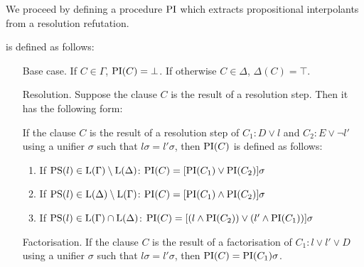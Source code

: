We proceed by defining a procedure $\operatorname{PI}$ which extracts propositional interpolants from a resolution refutation.

\begin{defi}
	 is defined as follows:
\begin{itemize}
	\item[Base case.]
		If $C \in \Gamma$, $\operatorname{PI}(C) = \bot$. 
		If otherwise $C \in \Delta$, $\Delta(C) = \top$. 
	\item[Resolution.]
	\label{def:PI_resolution}
		Suppose the clause $C$ is the result of a resolution step. Then it has the following form: 

		If the clause $C$ is the result of a resolution step of $C_1: D \lor l$ and $C_2: E \lor \lnot l'$ using a unifier $\sigma$ such that $l\sigma = l'\sigma$, then $\operatorname{PI}(C)$ is defined as follows:
		\begin{enumerate}
			\item If $\operatorname{PS}(l) \in \operatorname{L}(\Gamma) \setminus \operatorname{L}(\Delta)$: $\operatorname{PI}(C) = [\operatorname{PI}(C_1) \lor \operatorname{PI}(C_2)]\sigma$
			\item If $\operatorname{PS}(l) \in \operatorname{L}(\Delta) \setminus \operatorname{L}(\Gamma)$: $\operatorname{PI}(C) = [\operatorname{PI}(C_1) \land \operatorname{PI}(C_2)]\sigma$
			\item If $\operatorname{PS}(l) \in \operatorname{L}(\Gamma) \cap \operatorname{L}(\Delta)$: $\operatorname{PI}(C) = [(l \land \operatorname{PI}(C_2)) \lor (l' \land \operatorname{PI}(C_1)) ]\sigma $
		\end{enumerate}

	\item[Factorisation.]
		If the clause $C$ is the result of a factorisation of $C_1: l \lor l' \lor D$ using a unifier $\sigma$ such that $l\sigma = l'\sigma$, then $\operatorname{PI}(C) = \operatorname{PI}(C_1)\sigma$.


\end{itemize}
\end{defi}
